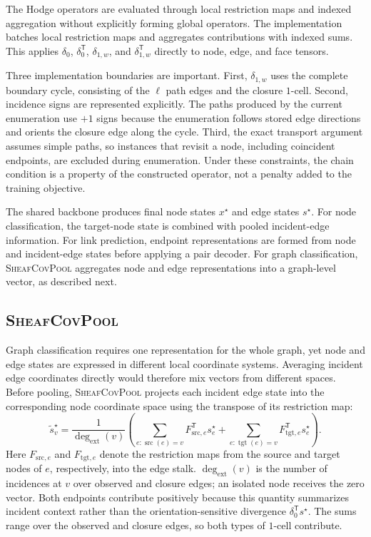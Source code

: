 \documentclass[sigconf,anonymous,review]{acmart}
\newcommand{\sheafcovpool}{\textsc{SheafCovPool}}
\newcommand{\transpose}{\mathsf{T}}
\begin{document}
The Hodge operators are evaluated through local restriction maps and indexed aggregation without explicitly forming global operators. The implementation batches local restriction maps and aggregates
contributions with indexed sums.  This applies \(\delta_0\), \(\delta_0^{\transpose}\),
\(\delta_{1,w}\), and \(\delta_{1,w}^{\transpose}\) directly to node, edge, and face tensors.

Three implementation boundaries are important.  First, \(\delta_{1,w}\) uses the complete boundary
cycle, consisting of the \(\ell\) path edges and the closure \(1\)-cell.  Second, incidence signs are
represented explicitly.  The paths produced by the current enumeration use \(+1\) signs because the enumeration follows stored edge directions and orients the closure edge along the cycle.  Third, the exact
transport argument assumes simple paths, so instances that revisit a node, including coincident
endpoints, are excluded during enumeration.  Under these constraints, the chain condition is a
property of the constructed operator, not a penalty added to the training objective.

The shared backbone produces final node states \(x^\star\) and edge states \(s^\star\). For node classification, the target-node state is combined with pooled incident-edge information. For link prediction, endpoint representations are formed from node and incident-edge states before applying a pair decoder. For graph classification, \sheafcovpool{} aggregates node and edge
representations into a graph-level vector, as described next.

\subsection{\sheafcovpool{}}

Graph classification requires one representation for the whole graph, yet node and edge states
are expressed in different local coordinate systems. Averaging incident edge coordinates directly
would therefore mix vectors from different spaces. Before pooling, \sheafcovpool{} projects each incident edge state into the corresponding node coordinate space using the transpose of its restriction map:
\begin{equation}
  \widetilde{s}_v^\star
  =
  \frac{1}{\deg_{\mathrm{ext}}(v)}
  \left(
  \sum_{e:\operatorname{src}(e)=v}
  F_{\mathrm{src},e}^{\transpose}s_e^\star
  +
  \sum_{e:\operatorname{tgt}(e)=v}
  F_{\mathrm{tgt},e}^{\transpose}s_e^\star
  \right).
  \label{eq:pool-transport}
\end{equation}
Here \(F_{\mathrm{src},e}\) and \(F_{\mathrm{tgt},e}\) denote the restriction maps from the source
and target nodes of \(e\), respectively, into the edge stalk. \(\deg_{\mathrm{ext}}(v)\) is the
number of incidences at \(v\) over observed and closure edges; an isolated node receives the zero vector.
Both endpoints contribute positively because this quantity summarizes incident context rather than
the orientation-sensitive divergence \(\delta_0^{\transpose}s^\star\). The sums range over the
observed and closure edges, so both types of \(1\)-cell contribute.
\end{document}
